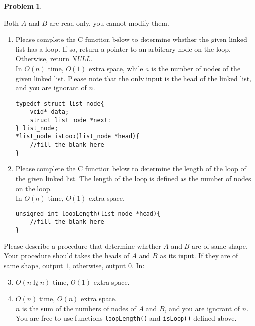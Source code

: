 \documentclass[12pt,a4paper]{report}
\theoremstyle{definition}
\newtheorem{problem}{\textbf{Problem}}
\theoremstyle{definition}
\begin{document}
\begin{problem}
\begin{enumerate}[label=\arabic*.]
        Both $A$ and $B$ are read-only, you cannot modify them.
    \begin{enumerate}[label=\alph*.]
        \item Please complete the C function below to determine whether the given linked list has a loop. If so, return a pointer to an arbitrary node on the loop.  Otherwise, return \textit{NULL}.\\
        In $O(n)$ time, $O(1)$ extra space, while $n$ is the number of nodes of the given linked list. Please note that the only input is the head of the linked list, and you are ignorant of $n$.

\begin{lstlisting}
typedef struct list_node{
    void* data;
    struct list_node *next;
} list_node;
*list_node isLoop(list_node *head){
    //fill the blank here
}
\end{lstlisting}

        \item Please complete the C function below to determine the length of the loop of the given linked list. The length of the loop is defined as the number of nodes on the loop.\\
        In $O(n)$ time, $O(1)$ extra space.

\begin{lstlisting}
unsigned int loopLength(list_node *head){
    //fill the blank here
}
\end{lstlisting}
\end{enumerate}
        Please describe a procedure that determine whether $A$ and $B$ are of same shape. Your procedure should takes the heads of $A$ and $B$ as its input. If they are of same shape, output $1$, otherwise, output $0$. In:
\begin{enumerate}[label=\alph*.]
    \setcounter{enumii}{2}
        \item $O(n \lg n)$ time, $O(1)$ extra space.
        \item $O(n)$ time, $O(n)$ extra space.\\
    \noindent $n$ is the sum of the numbers of nodes of $A$ and $B$, and you are ignorant of $n$. You are free to use functions \texttt{loopLength()} and \texttt{isLoop()} defined above.
    \end{enumerate}

\end{enumerate}
\end{problem}

\newpage
\end{document}
